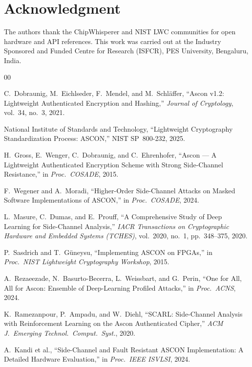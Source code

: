 \documentclass[conference]{IEEEtran}
\begin{document}
\section*{Acknowledgment}

The authors thank the ChipWhisperer and NIST LWC communities
for open hardware and API references. This work was carried out
at the Industry Sponsored and Funded Centre for Research
(ISFCR), PES University, Bengaluru, India.

\begin{thebibliography}{00}

C.~Dobraunig, M.~Eichlseder, F.~Mendel, and M.~Schl\"{a}ffer,
``Ascon v1.2: Lightweight Authenticated Encryption and
Hashing,'' \textit{Journal of Cryptology}, vol.~34, no.~3,
2021.

National Institute of Standards and Technology, ``Lightweight
Cryptography Standardization Process: ASCON,'' NIST
SP~800-232, 2025.

H.~Gross, E.~Wenger, C.~Dobraunig, and C.~Ehrenhofer,
``Ascon --- A Lightweight Authenticated Encryption Scheme
with Strong Side-Channel Resistance,'' in
\textit{Proc.\ COSADE}, 2015.

F.~Wegener and A.~Moradi, ``Higher-Order Side-Channel Attacks
on Masked Software Implementations of ASCON,'' in
\textit{Proc.\ COSADE}, 2024.

L.~Masure, C.~Dumas, and E.~Prouff, ``A Comprehensive Study
of Deep Learning for Side-Channel Analysis,'' \textit{IACR
Transactions on Cryptographic Hardware and Embedded Systems
(TCHES)}, vol.~2020, no.~1, pp.~348--375, 2020.

P.~Sasdrich and T.~G\"{u}neysu, ``Implementing ASCON on
FPGAs,'' in \textit{Proc.\ NIST Lightweight Cryptography
Workshop}, 2015.

A.~Rezaeezade, N.~Basurto-Becerra, L.~Weissbart, and G.~Perin,
``One for All, All for Ascon: Ensemble of Deep-Learning
Profiled Attacks,'' in \textit{Proc.\ ACNS}, 2024.

K.~Ramezanpour, P.~Ampadu, and W.~Diehl, ``SCARL:
Side-Channel Analysis with Reinforcement Learning on the
Ascon Authenticated Cipher,'' \textit{ACM J.\ Emerging
Technol.\ Comput.\ Syst.}, 2020.

A.~Kandi et al., ``Side-Channel and Fault Resistant {ASCON}
Implementation: A Detailed Hardware Evaluation,'' in
\textit{Proc.\ IEEE ISVLSI}, 2024.

\end{thebibliography}
\end{document}
